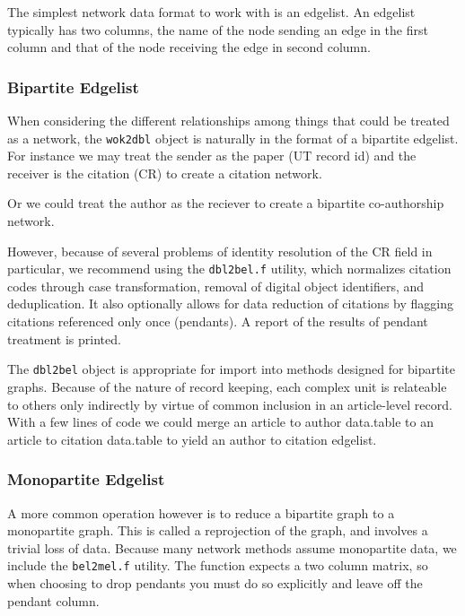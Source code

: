 The simplest network data format to work with is an edgelist. An
edgelist typically has two columns, the name of the node sending an edge
in the first column and that of the node receiving the edge in second
column.

\subsubsection{Bipartite Edgelist}\label{bipartite-edgelist}

When considering the different relationships among things that could be
treated as a network, the \texttt{wok2dbl} object is naturally in the
format of a bipartite edgelist. For instance we may treat the sender as
the paper (UT record id) and the receiver is the citation (CR) to create
a citation network.

Or we could treat the author as the reciever to create a bipartite
co-authorship network.

However, because of several problems of identity resolution of the CR
field in particular, we recommend using the \texttt{dbl2bel.f} utility,
which normalizes citation codes through case transformation, removal of
digital object identifiers, and deduplication. It also optionally allows
for data reduction of citations by flagging citations referenced only
once (pendants). A report of the results of pendant treatment is
printed.

The \texttt{dbl2bel} object is appropriate for import into methods
designed for bipartite graphs. Because of the nature of record keeping,
each complex unit is relateable to others only indirectly by virtue of
common inclusion in an article-level record. With a few lines of code we
could merge an article to author data.table to an article to citation
data.table to yield an author to citation edgelist.

\subsubsection{Monopartite Edgelist}\label{monopartite-edgelist}

A more common operation however is to reduce a bipartite graph to a
monopartite graph. This is called a reprojection of the graph, and
involves a trivial loss of data. Because many network methods assume
monopartite data, we include the \texttt{bel2mel.f} utility. The
function expects a two column matrix, so when choosing to drop pendants
you must do so explicitly and leave off the pendant column.

